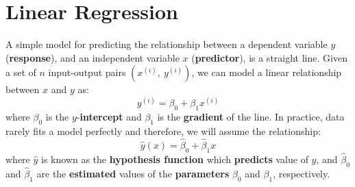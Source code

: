 \documentclass{article}
\begin{document}
\section{Linear Regression}
A simple model for predicting the relationship between a dependent
variable \(y\) (\textbf{response}), and an independent variable \(x\)
(\textbf{predictor}), is a straight line. Given a set of \(n\)
input-output pairs \(\left( x^{\left( i \right)},\: y^{\left( i
\right)} \right)\), we can model a linear relationship between \(x\)
and \(y\) as:
\begin{equation*}
    y^{\left( i \right)} = \beta_0 + \beta_1 x^{\left( i \right)}
\end{equation*}
where \(\beta_0\) is the \(y\)-\textbf{intercept} and \(\beta_1\) is the
\textbf{gradient} of the line. In practice, data rarely fits a model
perfectly and therefore, we will assume the relationship:
\begin{equation*}
    \hat{y}\left( x \right) = \hat{\beta}_0 + \hat{\beta}_1 x
\end{equation*}
where \(\hat{y}\) is known as the \textbf{hypothesis function} which
\textbf{predicts} value of \(y\), and \(\hat{\beta}_0\) and
\(\hat{\beta}_1\) are the \textbf{estimated} values of the
\textbf{parameters} \(\beta_0\) and \(\beta_1\), respectively.
\end{document}
